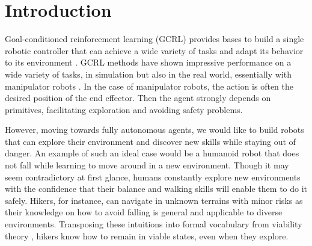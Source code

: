 \section{Introduction}

Goal-conditioned reinforcement learning (GCRL) provides 
bases to build a single robotic controller that can achieve a wide variety of tasks and
adapt its behavior to its environment \cite{colas2022autotelic, VGCRL, UVFA, HER}.
GCRL methods have shown impressive performance on a wide variety of tasks, in simulation but also in the real world, 
essentially with manipulator robots \cite{RIS,skewfit,PlanningWithGCpolicies}.
In the case of manipulator robots, the action is often the desired position of the end effector. Then the agent strongly depends on primitives, 
facilitating exploration and avoiding safety problems.  

However, moving towards fully autonomous agents, we would like to build robots that can explore their environment 
and discover new skills while staying out of danger. An example of such an ideal case would be 
a humanoid robot that does not fall while learning to move around in a new environment. Though it may seem contradictory at first glance, 
humans constantly explore new environments with the confidence that their balance and walking skills will enable them to do it safely.
Hikers, for instance, can navigate in unknown terrains with minor risks as 
their knowledge on how to avoid falling is general and applicable to diverse environments. 
Transposing these intuitions into formal vocabulary from viability theory \cite{viability_wieber}, hikers know how to remain in viable states, even when they explore.

